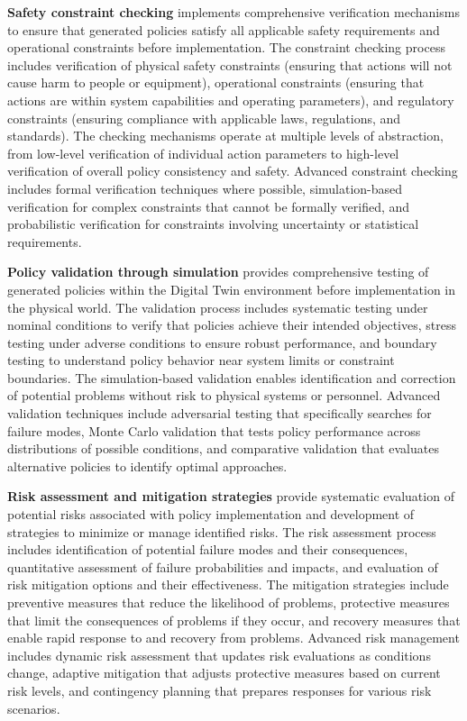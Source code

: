\textbf{Safety constraint checking} implements comprehensive verification mechanisms to ensure that generated policies satisfy all applicable safety requirements and operational constraints before implementation. The constraint checking process includes verification of physical safety constraints (ensuring that actions will not cause harm to people or equipment), operational constraints (ensuring that actions are within system capabilities and operating parameters), and regulatory constraints (ensuring compliance with applicable laws, regulations, and standards). The checking mechanisms operate at multiple levels of abstraction, from low-level verification of individual action parameters to high-level verification of overall policy consistency and safety. Advanced constraint checking includes formal verification techniques where possible, simulation-based verification for complex constraints that cannot be formally verified, and probabilistic verification for constraints involving uncertainty or statistical requirements.

\textbf{Policy validation through simulation} provides comprehensive testing of generated policies within the Digital Twin environment before implementation in the physical world. The validation process includes systematic testing under nominal conditions to verify that policies achieve their intended objectives, stress testing under adverse conditions to ensure robust performance, and boundary testing to understand policy behavior near system limits or constraint boundaries. The simulation-based validation enables identification and correction of potential problems without risk to physical systems or personnel. Advanced validation techniques include adversarial testing that specifically searches for failure modes, Monte Carlo validation that tests policy performance across distributions of possible conditions, and comparative validation that evaluates alternative policies to identify optimal approaches.

\textbf{Risk assessment and mitigation strategies} provide systematic evaluation of potential risks associated with policy implementation and development of strategies to minimize or manage identified risks. The risk assessment process includes identification of potential failure modes and their consequences, quantitative assessment of failure probabilities and impacts, and evaluation of risk mitigation options and their effectiveness. The mitigation strategies include preventive measures that reduce the likelihood of problems, protective measures that limit the consequences of problems if they occur, and recovery measures that enable rapid response to and recovery from problems. Advanced risk management includes dynamic risk assessment that updates risk evaluations as conditions change, adaptive mitigation that adjusts protective measures based on current risk levels, and contingency planning that prepares responses for various risk scenarios.

